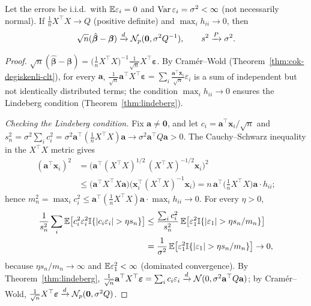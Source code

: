 \documentclass[main.tex]{subfiles}
\begin{document}
\begin{theorem}\label{thm:ekk-asimptotik}
Let the errors be i.i.d.\ with $\mathbb{E}\varepsilon_i=0$ and $\operatorname{Var}\varepsilon_i=\sigma^2<\infty$ (not necessarily normal). If $\frac1nX^\top X\to Q$ (positive definite) and $\max_ih_{ii}\to0$, then
\[
\sqrt n(\hat{\bm\beta}-\bm\beta)\xrightarrow{d}\mathcal{N}_p(\mathbf 0,\sigma^2Q^{-1}),\qquad s^2\xrightarrow{P}\sigma^2 .
\]
\end{theorem}
\begin{proof}
$\sqrt n(\hat{\bm\beta}-\bm\beta)=\big(\tfrac1nX^\top X\big)^{-1}\tfrac{1}{\sqrt n}X^\top\bm\varepsilon$. By Cramér--Wold (Theorem~\ref{thm:cok-degiskenli-clt}), for every $\mathbf a$, $\frac{1}{\sqrt n}\mathbf a^\top X^\top\bm\varepsilon=\sum_i\frac{\mathbf a^\top\mathbf x_i}{\sqrt n}\varepsilon_i$ is a sum of independent but not identically distributed terms; the condition $\max_ih_{ii}\to0$ ensures the Lindeberg condition (Theorem~\ref{thm:lindeberg}).

\emph{Checking the Lindeberg condition.} Fix $\mathbf a\ne\mathbf 0$, and let $c_i=\mathbf a^\top\mathbf x_i/\sqrt n$ and $s_n^2=\sigma^2\sum_ic_i^2=\sigma^2\mathbf a^\top(\tfrac1nX^\top X)\mathbf a\to\sigma^2\mathbf a^\top Q\mathbf a>0$. The Cauchy--Schwarz inequality in the $X^\top X$ metric gives
\begin{align*}
(\mathbf a^\top\mathbf x_i)^2&=\big(\mathbf a^\top(X^\top X)^{1/2}\,(X^\top X)^{-1/2}\mathbf x_i\big)^2\\&\le\big(\mathbf a^\top X^\top X\mathbf a\big)\big(\mathbf x_i^\top(X^\top X)^{-1}\mathbf x_i\big)=n\,\mathbf a^\top\big(\tfrac1nX^\top X\big)\mathbf a\cdot h_{ii} ;
\end{align*}
hence $m_n^2=\max_ic_i^2\le\mathbf a^\top(\tfrac1nX^\top X)\mathbf a\cdot\max_ih_{ii}\to0$. For every $\eta>0$,
\begin{align*}
\frac1{s_n^2}\sum_i\E\big[c_i^2\varepsilon_i^2\I\{|c_i\varepsilon_i|>\eta s_n\}\big]&\le\frac{\sum_ic_i^2}{s_n^2}\,\E\big[\varepsilon_1^2\I\{|\varepsilon_1|>\eta s_n/m_n\}\big]\\&=\frac1{\sigma^2}\,\E\big[\varepsilon_1^2\I\{|\varepsilon_1|>\eta s_n/m_n\}\big]\to0,
\end{align*}
because $\eta s_n/m_n\to\infty$ and $\mathbb{E}\varepsilon_1^2<\infty$ (dominated convergence). By Theorem~\ref{thm:lindeberg}, $\frac1{\sqrt n}\mathbf a^\top X^\top\bm\varepsilon=\sum_ic_i\varepsilon_i\xrightarrow{d}\mathcal{N}(0,\sigma^2\mathbf a^\top Q\mathbf a)$; by Cramér--Wold, $\frac1{\sqrt n}X^\top\bm\varepsilon\xrightarrow{d}\mathcal{N}_p(\mathbf 0,\sigma^2Q)$.


\end{proof}
\end{document}
